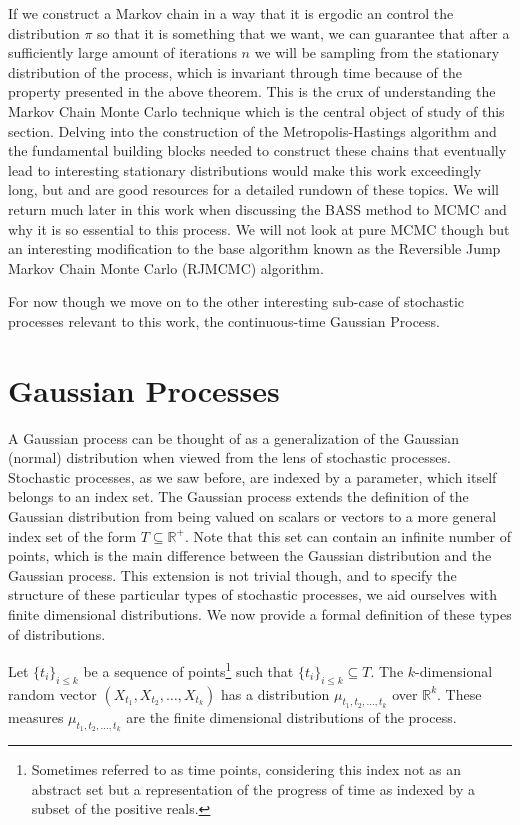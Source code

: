 If we construct a Markov chain in a way that it is ergodic an control the distribution $\pi$ so that it is something that we want, we can guarantee that after a sufficiently large amount of iterations $n$ we will be sampling from the stationary distribution of the process, which is invariant through time because of the property presented in the above theorem. This is the crux of understanding the Markov Chain Monte Carlo technique which is the central object of study of this section. Delving into the construction of the Metropolis-Hastings algorithm and the fundamental building blocks needed to construct these chains that eventually lead to interesting stationary distributions would make this work exceedingly long, but \cite{rubinstein2016simulation} and \cite{robert1999monte} are good resources for a detailed rundown of these topics. We will return much later in this work when discussing the BASS method to MCMC and why it is so essential to this process. We will not look at pure MCMC though but an interesting modification to the base algorithm known as the Reversible Jump Markov Chain Monte Carlo (RJMCMC) algorithm. 

For now though we move on to the other interesting sub-case of stochastic processes relevant to this work, the continuous-time Gaussian Process. 

\section{Gaussian Processes}

A Gaussian process can be thought of as a generalization of the Gaussian (normal) distribution when viewed from the lens of stochastic processes. Stochastic processes, as we saw before, are indexed by a parameter, which itself belongs to an index set. The Gaussian process extends the definition of the Gaussian distribution from being valued on scalars or vectors to a more general index set of the form $T \subseteq \mathbb{R}^+$. Note that this set can contain an infinite number of points, which is the main difference between the Gaussian distribution and the Gaussian process. This extension is not trivial though, and to specify the structure of these particular types of stochastic processes, we aid ourselves with finite dimensional distributions. We now provide a formal definition of these types of distributions. 

\begin{definition}
	Let $\{ t_i \}_{i \leq k}$ be a sequence of points\footnote{Sometimes referred to as time points, considering this index not as an abstract set but a representation of the progress of time as indexed by a subset of the positive reals.} such that $\{ t_i \}_{i \leq k} \subseteq T$. The $k$-dimensional random vector $(X_{t_1}, X_{t_2}, \ldots, X_{t_k})$ has a distribution $\mu_{t_1, t_2, \ldots, t_k}$ over $\mathbb{R}^k$. These measures $\mu_{t_1, t_2, \ldots, t_k}$ are the finite dimensional distributions of the process. 
\end{definition}


